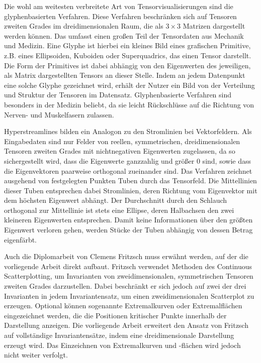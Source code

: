 \documentclass[a4paper,fontsize=12pt,toc=bib,parskip=half,ngerman]{scrartcl}
\begin{document}
Die wohl am weitesten verbreitete Art von Tensorvisualisierungen sind die glyphenbasierten Verfahren. Diese Verfahren beschr\"anken sich auf Tensoren zweiten Grades im dreidimensionalen Raum, die als $3\times3$ Matrizen dargestellt werden k\"onnen. Das umfasst einen gro{\ss}en Teil der Tensordaten aus Mechanik und Medizin. Eine Glyphe ist hierbei ein kleines Bild eines grafischen Primitive, z.B. eines Ellipsoiden, Kuboiden oder Superquadrics\cite{kindlmann2004superquadric}, das einen Tensor darstellt. Die Form der Primitives ist dabei abh\"angig von den Eigenwerten des jeweiligen, als Matrix dargestellten Tensors an dieser Stelle. Indem an jedem Datenpunkt eine solche Glyphe gezeichnet wird, erh\"alt der Nutzer ein Bild von der Verteilung und Struktur der Tensoren im Datensatz. Glyphenbasierte Verfahren sind besonders in der Medizin beliebt, da sie leicht R\"uckschl\"usse auf die Richtung von Nerven- und Muskelfasern zulassen.

Hyperstreamlines\cite{delmarcelle1993visualizing} bilden ein Analogon zu den Stromlinien bei Vektorfeldern. Als Eingabedaten sind nur Felder von reellen, symmetrischen, dreidimensionalen Tensoren zweiten Grades mit nichtnegativen Eigenwerten zugelassen, da so sichergestellt wird, dass die Eigenwerte ganzzahlig und gr\"o{\ss}er 0 sind, sowie dass die Eigenvektoren paarweise orthogonal zueinander sind. Das Verfahren zeichnet ausgehend von festgelegten Punkten Tuben durch das Tensorfeld. Die Mittellinien dieser Tuben entsprechen dabei Stromlinien, deren Richtung vom Eigenvektor mit dem h\"ochsten Eigenwert abh\"angt. Der Durchschnitt durch den Schlauch orthogonal zur Mittellinie ist stets eine Ellipse, deren Halbachsen den zwei kleineren Eigenwerten entsprechen. Damit keine Informationen \"uber den gr\"o{\ss}ten Eigenwert verloren gehen, werden St\"ucke der Tuben abh\"angig von dessen Betrag eigenf\"arbt.

Auch die Diplomarbeit von Clemens Fritzsch\cite{fritzsch2016continuousScatterplot} muss erw\"ahnt werden, auf der die vorliegende Arbeit direkt aufbaut. Fritzsch verwendet Methoden des Continuous Scatterplotting, um Invarianten von zweidimensionalen, symmetrischen Tensoren zweiten Grades darzustellen. Dabei beschr\"ankt er sich jedoch auf zwei der drei Invarianten in jedem Invariantensatz, um einen zweidimensionalen Scatterplot zu erzeugen. Optional k\"onnen sogenannte \glq Extremalkurven \grq{} oder \glq Extremalfl\"achen \grq{} eingezeichnet werden, die die Positionen kritischer Punkte innerhalb der Darstellung anzeigen.  Die vorliegende Arbeit erweitert den Ansatz von Fritzsch auf vollst\"andige Invariantens\"atze, indem eine dreidimensionale Darstellung erzeugt wird. Das Einzeichnen von Extremalkurven und -fl\"achen wird jedoch nicht weiter verfolgt.
\end{document}
